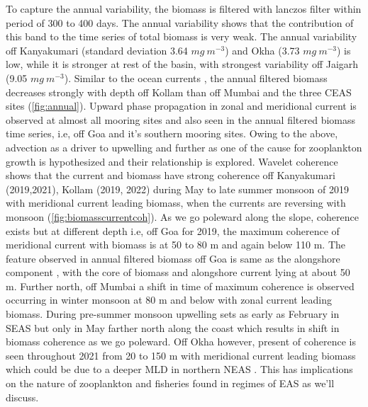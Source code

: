 \documentclass{article}
\begin{document}
	To capture the annual variability, the biomass is filtered with lanczos filter within period of 300 to 400 days. The annual variability shows that the contribution of this band to the time series of total biomass is very weak. The annual variability off Kanyakumari (standard deviation 3.64 $mg\ m^{-3}$) and Okha (3.73 $mg\ m^{-3}$) is low, while it is stronger at rest of the basin, with strongest variability off Jaigarh (9.05 $mg\ m^{-3}$). Similar to the ocean currents \citep{amol2014observed,chaudhuri2020observed}, the annual filtered biomass decreases strongly with depth off Kollam than off Mumbai and the three CEAS sites (\cref{fig:annual}). Upward phase propagation in zonal and meridional current is observed at almost all mooring sites and also seen in the annual filtered biomass time series, i.e, off Goa and it's southern mooring sites. Owing to the above, advection as a driver to upwelling and further as one of the cause for zooplankton growth is hypothesized and their relationship is explored. Wavelet coherence shows that the current and biomass have strong coherence off Kanyakumari (2019,2021), Kollam (2019, 2022) during May to late summer monsoon of 2019 with meridional current leading biomass, when the currents are reversing with monsoon (\cref{fig:biomasscurrentcoh}). As we go poleward along the slope, coherence exists but at different depth i.e, off Goa for 2019, the maximum coherence of meridional current with biomass is at 50 to 80 m and again below 110 m. The feature observed in annual filtered biomass off Goa is same as the alongshore component \citep{nethery2007zm}, with the core of biomass and alongshore current lying at about 50 m. Further north, off Mumbai a shift in time of maximum coherence is observed occurring in winter monsoon at 80 m and below with zonal current leading biomass. During pre-summer monsoon upwelling sets as early as February in SEAS but only in May farther north along the coast \citep{banse1968hydrography,} which results in shift in biomass coherence as we go poleward. Off Okha however,  present of coherence is seen throughout 2021 from 20 to 150 m with meridional current leading biomass which could be due to a deeper MLD in northern NEAS \citep{marra2005jgofs,shankar2016inhibition}. This has implications on the nature of zooplankton and fisheries found in regimes of EAS as we'll discuss.
	
\end{document}
